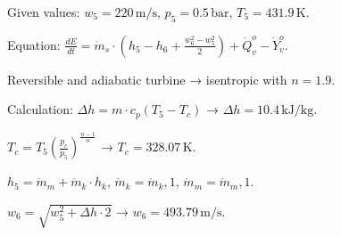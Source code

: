 Given values:  
\( w_5 = 220 \, \text{m/s} \), \( p_5 = 0.5 \, \text{bar} \), \( T_5 = 431.9 \, \text{K} \).  

Equation:  
\( \frac{d \dot{E}}{dt} = \dot{m}_s \cdot (h_5 - h_6 + \frac{w_6^2 - w_5^2}{2}) + \dot{Q}_{v}^o - \dot{Y}_{v}^o \).  

Reversible and adiabatic turbine → isentropic with \( n = 1.9 \).  

Calculation:  
\( \Delta h = m \cdot c_p (T_5 - T_c) \) → \( \Delta h = 10.4 \, \text{kJ/kg} \).  

\( T_c = T_5 (\frac{p_c}{p_5})^{\frac{n-1}{n}} \) → \( T_c = 328.07 \, \text{K} \).  

\( h_5 = \dot{m}_m + \dot{m}_k \cdot h_k \), \( \dot{m}_k = \dot{m}_k,1 \), \( \dot{m}_m = \dot{m}_m,1 \).  

\( w_6 = \sqrt{w_5^2 + \Delta h \cdot 2} \) → \( w_6 = 493.79 \, \text{m/s} \).